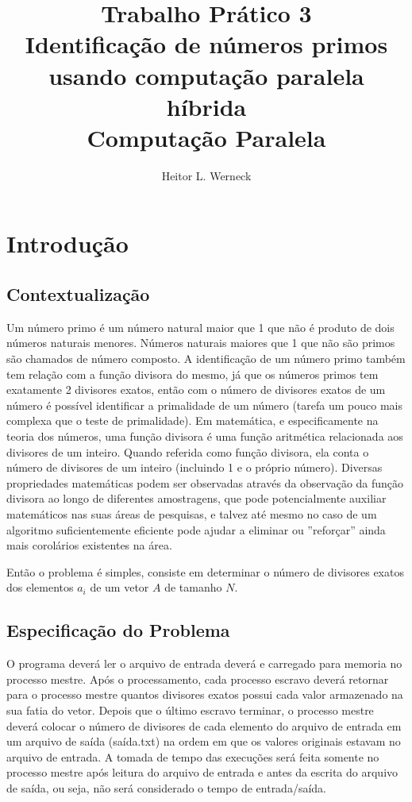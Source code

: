 \documentclass[12pt]{article}
\title{Trabalho Prático 3\\ Identificação de números primos usando computação paralela híbrida \\
	\large Computação Paralela}
\author{Heitor L. Werneck}
\begin{document}
\maketitle

\newpage
\tableofcontents

\newpage

\section{Introdução}
\subsection{Contextualização}

Um número primo é um número natural maior que 1 que não é produto de dois números naturais menores. Números naturais maiores que 1 que não são primos são chamados de número composto. A identificação de um número primo também tem relação com a função divisora do mesmo, já que os números primos tem exatamente 2 divisores exatos, então com o número de divisores exatos de um número é possível identificar a primalidade de um número (tarefa um pouco mais complexa que o teste de primalidade). Em matemática, e especificamente na teoria dos números, uma função divisora é uma função aritmética relacionada aos divisores de um inteiro. Quando referida como função divisora, ela conta o número de divisores de um inteiro (incluindo 1 e o próprio número). Diversas propriedades matemáticas podem ser observadas através da observação da função divisora ao longo de diferentes amostragens, que pode potencialmente auxiliar matemáticos nas suas áreas de pesquisas, e talvez até mesmo no caso de um algoritmo suficientemente eficiente pode ajudar a eliminar ou ''reforçar'' ainda mais corolários existentes na área.

Então o problema é simples, consiste em determinar o número de divisores exatos dos elementos $a_i$ de um vetor $A$ de tamanho $N$.


\subsection{Especificação do Problema}

O programa deverá ler o arquivo de entrada deverá e carregado para memoria no processo mestre. Após o processamento, cada processo escravo deverá retornar para o processo mestre quantos divisores exatos possui cada valor armazenado na sua fatia do vetor. Depois que o último escravo terminar, o processo mestre deverá colocar o número de divisores de cada elemento do arquivo de entrada em um arquivo de saída (saída.txt) na ordem em que os valores originais estavam no arquivo de entrada. A tomada de tempo das execuções será feita somente no processo mestre após leitura do arquivo de entrada e antes da escrita do arquivo de saída, ou seja, não será considerado o tempo de entrada/saída.
\end{document}
